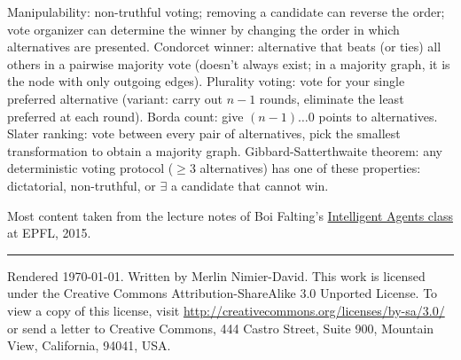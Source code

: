 \documentclass[10pt,a4paper,landscape]{article}
\newcommand{\concept}[1]{\textcolor{Emerald}{#1}} %
\renewcommand{\section}[1]{
    \vspace{-0.3cm}
    \begin{center}
      \color{Bittersweet}
      \hrulefill{\small~~#1~~}\hrulefill
    \end{center}
    \vspace{-0.3cm}
  }
\renewcommand{\subsection}[1]{\section{#1}}
\begin{document}
\begin{multicols*}{4}
\concept{Manipulability}: non-truthful voting; removing a candidate can reverse the order; vote organizer can determine the winner by changing the order in which alternatives are presented.
\concept{Condorcet winner}: alternative that beats (or ties) all others in a pairwise majority vote (doesn't always exist; in a majority graph, it is the node with only outgoing edges).
\concept{Plurality voting}: vote for your single preferred alternative (variant: carry out $n - 1$ rounds, eliminate the least preferred at each round).
\concept{Borda count}: give $(n - 1) \dots 0$ points to alternatives.
\concept{Slater ranking}: vote between every pair of alternatives, pick the smallest transformation to obtain a majority graph.
\concept{Gibbard-Satterthwaite theorem}: any deterministic voting protocol ($\geq 3$ alternatives) has one of these properties: dictatorial, non-truthful, or $\exists$ a candidate that cannot win.

\ifdefined \longversion %
\else \newpage
\fi



\section{Credits}
Most content taken from the lecture notes of Boi Falting's \href{http://edu.epfl.ch/coursebook/en/intelligent-agents-CS-430}{Intelligent Agents class} at EPFL, 2015.

\vspace{0.5cm}
\hrule
\vspace{0.5cm}
\tiny
Rendered \today. Written by Merlin Nimier-David.
This work is licensed under the Creative Commons Attribution-ShareAlike 3.0 Unported License.
To view a copy of this license, visit \href{http://creativecommons.org/licenses/by-sa/3.0/}{http://creativecommons.org/licenses/by-sa/3.0/} or
send a letter to Creative Commons, 444 Castro Street, Suite 900, Mountain View, California, 94041, USA.
\end{multicols*}
\end{document}
